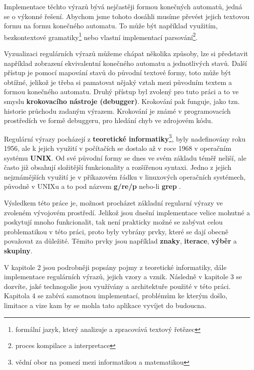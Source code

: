 Implementace těchto výrazů bývá nejčastěji formou konečných automatů, jedná se o výkonné řešení. 
Abychom jsme tohoto dosáhli musíme převést jejich textovou formu na formu konečného automatu.
To může být například využitím, bezkontextové gramatiky\footnote{formální jazyk, který analizuje a zpracovává textový řetězec} nebo vlastní implementací parsování\footnote{proces kompilace a interpretace}.


Vyzualizaci regulárních výrazů můžeme chápat několika způsoby, 
lze si představit například zobrazení ekvivalentní konečného automatu a jednotlivých stavů. 
Další přístup je pomocí mapování stavů do původní textové formy, toto může být obtížné, jelikož je třeba si pamatovat
nějaký vztah mezi původním textem a formou konečného automatu. Druhý přístup byl zvolený pro tuto
práci a to ve smyslu \textbf{krokovacího nástroje (debugger)}. Krokování pak funguje, jako tzn.
historie průchodu zadaným výrazem. Krokování je známé v programovacích prostředích ve formě debuggeru,
pro hledání chyb ve zdrojovém kódu.

Regulární výrazy pocházejí z \textbf{teoretické informatiky}\footnote{vědní obor na pomezí mezi informatikou a matematikou}, 
byly nadefinovány roku 1956, ale k jejich využití v počítačích se dostalo až v roce 1968 v operačním systému \textbf{UNIX}.
Od své původní formy se dnes ve svém základu téměř neliší, ale často již obsahují složitější funkcionality a rozšířenou syntaxi.
Jedno z jejich nejznámějších využití je v příkazovém řádku v linuxových operačních systémech, původně v UNIXu a to pod názvem \textbf{g/re/p} nebo-li \textbf{grep} 
\cite{Wikipedia_2024}. 

Výsledkem této práce je, možnost procházet základní regularní výrazy ve zvoleném vývojovém prostředí. 
Jelikož jsou dnešní implementace velice mohutné a poskytují mnoho funkcionalit, tak není prakticky možné
se zabývat celou problematikou v této práci, proto byly vybrány prvky, které se dají obecně považovat za důležité. 
Těmito prvky jsou například \textbf{znaky}, \textbf{iterace}, \textbf{výběr} a \textbf{skupiny}.


V kapitole 2 jsou podrobněji popsány pojmy z teoretické informatiky, dále implementace regulárních výrazů, jejich vzory a vznik.
Následně v kapitole 3 se dozvíte, jaké technogolie jsou využívány a architektuře použité v této práci.
Kapitola 4 se zabívá samotnou implementací, problémům ke kterým došlo, limitace a vize kam by se mohla tato aplikace vyvíjet do budoucna.

\endinput